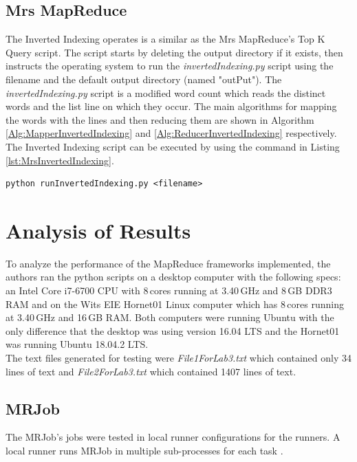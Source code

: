\documentclass[10pt, twocolumn]{article}
\begin{document}
\subsection{Mrs MapReduce}
%
The Inverted Indexing operates is a similar as the Mrs MapReduce's Top K Query script. The script starts by deleting the output directory if it exists, then instructs the operating system to run the \emph{invertedIndexing.py} script using the filename and the default output directory (named "outPut"). The \emph{invertedIndexing.py} script is a modified word count which reads the distinct words and the list line on which they occur. The main algorithms for mapping the words with the lines and then reducing them  are shown in Algorithm \ref*{Alg:MapperInvertedIndexing} and \ref*{Alg:ReducerInvertedIndexing} respectively. The Inverted Indexing script can be executed by using the command in Listing \ref*{lst:MrsInvertedIndexing}.
%
\begin{center}
\begin{minipage}{0.99\columnwidth}
\begin{lstlisting}[style=bashStyle, label=lst:MrsInvertedIndexing, caption = Command to execute Inverted Indexing (Mrs)]
python runInvertedIndexing.py <filename>
\end{lstlisting}
\end{minipage}
\end{center}
%
\section{Analysis of Results}
To analyze the performance of the MapReduce frameworks implemented, the authors ran the python scripts on a desktop computer with the following specs: an Intel Core i7-6700 CPU with 8\,cores running at 3.40\,GHz and 8\,GB DDR3\,RAM and on the Wits EIE Hornet01 Linux computer which has 8\,cores running at 3.40\,GHz and 16\,GB RAM. Both computers were running Ubuntu with the only difference that the desktop was using version 16.04 LTS and the Hornet01 was running Ubuntu 18.04.2 LTS.\\

\noindent The text files generated for testing were \emph{File1ForLab3.txt} which contained only 34 lines of text and \emph{File2ForLab3.txt} which contained 1407 lines of text. 
%
\subsection{MRJob}
%
The MRJob's jobs were tested in local runner configurations for the runners. A local runner runs MRJob in multiple sub-processes for each task \cite{ELEN4020A_REF:MrJobLocalRunner} .\\
\end{document}
